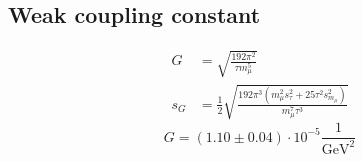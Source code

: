 \subsection{Weak coupling constant}
\begin{equation}
    \begin{split}
        G &= \sqrt{\frac{192 \pi^2}{\tau m_\mu^5}} \\
        s_G &= \frac{1}{2} \sqrt{\frac{192 \pi^3 \left( m_\mu^2 s_\tau^2 + 25 \tau^2 s_{m_\mu}^2 \right)}{m_\mu^7 \tau^3}}
    \end{split}
\end{equation}
\begin{equation}
    G = (1.10 \pm 0.04) \cdot 10^{-5} \frac{1}{\text{GeV}^2}
\end{equation}
